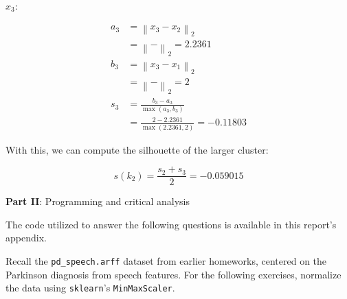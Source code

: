 \documentclass[12pt]{article}
\begin{document}
\begin{enumerate}[leftmargin=\labelsep]
\begin{enumerate}[leftmargin=\labelsep]
\begin{paracol}{2}
                  \switchcolumn

                  $x_3$:

                  \begin{equation*}
                    \begin{aligned}
                      a_3 & = \left\| x_3 - x_2 \right\|_2                                           \\
                          & = \left\|  -  \right\|_2
                      = 2.2361                                                                       \\
                      b_3 & = \left\| x_3 - x_1 \right\|_2                                           \\
                          & = \left\|  -  \right\|_2
                      = 2                                                                            \\
                      s_3 & = \frac{b_3 - a_3}{\max(a_3, b_3)}                                       \\
                          & = \frac{2 - 2.2361}{\max(2.2361, 2)} = -0.11803
                    \end{aligned}
                  \end{equation*}

                \end{paracol}

                With this, we can compute the silhouette of the larger cluster:

                \begin{equation*}
                  s(k_2) = \frac{s_2 + s_3}{2} = -0.059015
                \end{equation*}


        \end{enumerate}

\end{enumerate}

\pagebreak

\center\large{\textbf{Part II}: Programming and critical analysis}

\begin{justify}
  The code utilized to answer the following questions is available in this
  report's appendix.
\end{justify}

Recall the \texttt{pd\_speech.arff} dataset from earlier homeworks, centered on
the Parkinson diagnosis from speech features. For the following exercises, normalize
the data using \texttt{sklearn}'s \texttt{MinMaxScaler}.
\end{document}
